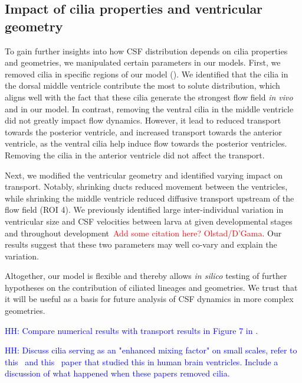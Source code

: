 \documentclass[fleqn]{wlscirep}
\newcommand{\lyng}[1]{\textcolor{blue}{#1}}
\newcommand{\fixme}[1]{\textcolor{red}{#1}}
\begin{document}
\subsection*{Impact of cilia properties and ventricular geometry}
To gain further insights into how CSF distribution depends on cilia properties and geometries,
we manipulated certain parameters in our models. First, we removed cilia in specific regions of
our model (). We identified that the cilia in the
dorsal middle ventricle contribute the most to solute distribution, which aligns well with the fact
that these cilia generate the strongest flow field \emph{in vivo} and in our model.
In contrast, removing the ventral cilia in the middle ventricle did not greatly impact flow dynamics.
However, it lead to reduced transport towards the posterior ventricle,
and increased transport towards the anterior ventricle, as the ventral cilia help induce
flow towards the posterior ventricles. Removing the cilia in the anterior ventricle did not affect the transport.

Next, we modified the ventricular geometry and identified varying impact on transport.
Notably, shrinking ducts reduced movement between the ventricles, while shrinking the middle ventricle
reduced diffusive transport upstream of the flow field (ROI 4).
We previously identified large inter-individual variation in ventricular size and
CSF velocities between larva at given developmental stages and throughout development~\fixme{Add some citation here? Olstad/D'Gama}.
Our results suggest that these two parameters may well co-vary and explain the variation.

Altogether, our model is flexible and thereby allows \emph{in silico} testing of
further hypotheses on the contribution of ciliated lineages and geometries.
We trust that it will be useful as a basis for future analysis of CSF dynamics in more complex geometries.

\lyng{HH: Compare numerical results with transport results in Figure 7 in \cite{Olstad2019CiliaryDevelopment}.}

\lyng{HH: Discuss cilia serving as an "enhanced mixing factor" on small scales, refer to this~\cite{Siyahhan2014FlowVentricles} and this~\cite{Yoshida2022EffectVentricles} paper that studied this in human brain ventricles. Include a discussion of what happened when these papers removed cilia.}
\end{document}
